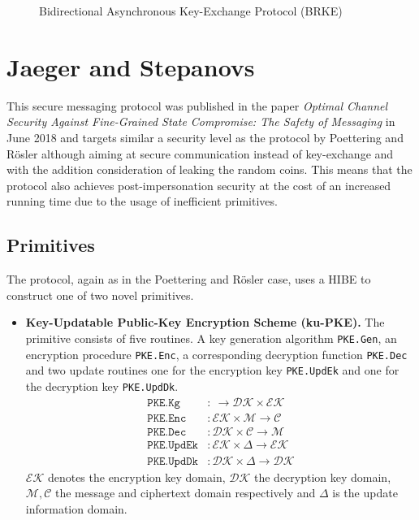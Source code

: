 \documentclass[11pt,a4paper,twoside,openright,bibliography=totoc]{scrbook}
\begin{document}
\begin{figure}[p]
  \centering
  \setlength{\fboxsep}{10pt}
  \scalebox{0.9}{%
    \fbox{%
      
    }
  }
  \caption{Bidirectional Asynchronous Key-Exchange Protocol (BRKE)}
  \label{fig:brke}
\end{figure}

\clearpage

\section[Jaeger and Stepanovs]
{Jaeger and Stepanovs~\cite{jaeger2018optimal}}
\label{sec:jaeger-stepanovs}

This secure messaging protocol was published in the paper
\textit{Optimal Channel Security Against Fine-Grained State Compromise: The Safety of Messaging}
in June 2018 and targets similar a security level as the protocol by
Poettering and Rösler although aiming at secure communication instead
of key-exchange and with the addition consideration of leaking the random coins.
This means that the protocol also achieves post-impersonation security
at the cost of an increased running time due to the usage
of inefficient primitives.

\subsection{Primitives}
\label{sec:primitives-1}

The protocol, again as in the Poettering and Rösler case, uses a HIBE to construct
one of two novel primitives.
\begin{itemize}
\item \textbf{Key-Updatable Public-Key Encryption Scheme (ku-PKE).} The primitive
  consists of five routines. A key generation algorithm \texttt{PKE.Gen},
  an encryption procedure \texttt{PKE.Enc}, a corresponding decryption
  function \texttt{PKE.Dec} and two update routines one for the
  encryption key \texttt{PKE.UpdEk} and one for the decryption key \texttt{PKE.UpdDk}.
  \begin{align*}
    \texttt{PKE.Kg} & : \ \rightarrow \mathcal{DK} \times \mathcal{EK} \\
    \texttt{PKE.Enc} & : \mathcal{EK} \times \mathcal{M} \rightarrow \mathcal{C} \\
    \texttt{PKE.Dec} & : \mathcal{DK} \times \mathcal{C} \rightarrow \mathcal{M} \\
    \texttt{PKE.UpdEk} & : \mathcal{EK} \times \Delta \rightarrow \mathcal{EK} \\
    \texttt{PKE.UpdDk} & : \mathcal{DK} \times \Delta \rightarrow \mathcal{DK}
  \end{align*}
  $\mathcal{EK}$ denotes the encryption key domain, $\mathcal{DK}$ the
  decryption key domain, $\mathcal{M}, \mathcal{C}$ the message and
  ciphertext domain respectively and $\Delta$ is the update information domain.
\end{itemize}
\end{document}
